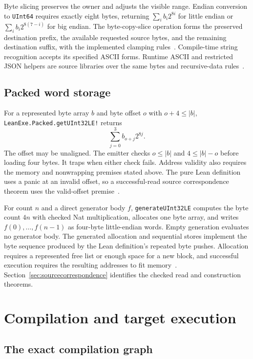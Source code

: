 \documentclass[11pt]{article}
\newcommand{\code}[1]{\texttt{#1}}
\begin{document}
Byte slicing preserves the owner and adjusts the visible range.  Endian conversion to \code{UInt64} requires exactly eight bytes, returning $\sum_i b_i2^{8i}$ for little endian or $\sum_i b_i2^{8(7-i)}$ for big endian.  The byte-copy-slice operation forms the preserved destination prefix, the available requested source bytes, and the remaining destination suffix, with the implemented clamping rules~\cite{values,binary}.  Compile-time string recognition accepts its specified ASCII forms.  Runtime ASCII and restricted JSON helpers are source libraries over the same bytes and recursive-data rules~\cite{specification}.

\subsection{Packed word storage}

For a represented byte array $b$ and byte offset $o$ with $o+4\le |b|$, \code{LeanExe.Packed.getUInt32LE!} returns
\[
\sum_{j=0}^{3} b_{o+j}2^{8j}.
\]
The offset may be unaligned.  The emitter checks $o\le |b|$ and $4\le |b|-o$ before loading four bytes.  It traps when either check fails.  Address validity also requires the memory and nonwrapping premises stated above.  The pure Lean definition uses a panic at an invalid offset, so a successful-read source correspondence theorem uses the valid-offset premise~\cite{packedsource,binary}.

For count $n$ and a direct generator body $f$, \code{generateUInt32LE} computes the byte count $4n$ with checked Nat multiplication, allocates one byte array, and writes $f(0),\ldots,f(n-1)$ as four-byte little-endian words.  Empty generation evaluates no generator body.  The generated allocation and sequential stores implement the byte sequence produced by the Lean definition's repeated byte pushes.  Allocation requires a represented free list or enough space for a new block, and successful execution requires the resulting addresses to fit memory~\cite{packedsource,extract,binary}.  Section~\ref{sec:sourcecorrespondence} identifies the checked read and construction theorems.

\section{Compilation and target execution}

\subsection{The exact compilation graph}
\end{document}
